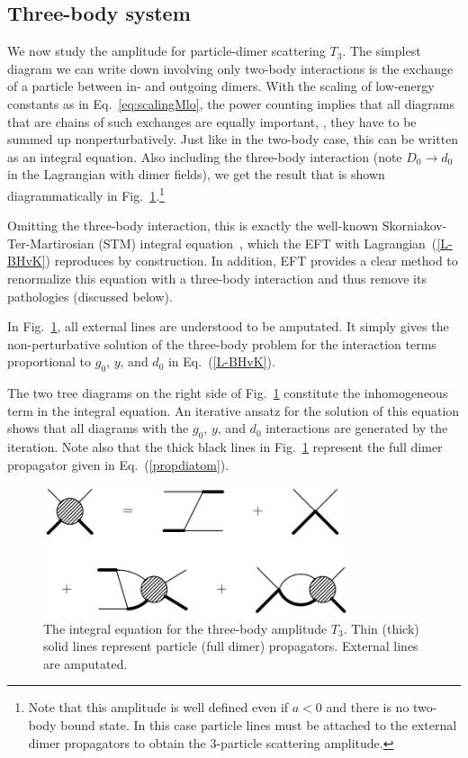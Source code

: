 \subsection{Three-body system}
\label{sec:EFT-ThreeBosons}

We now study the amplitude for particle-dimer scattering $T_3$.  The simplest 
diagram we can write down involving only two-body interactions is the exchange 
of a particle between in- and outgoing dimers.  With the scaling of low-energy 
constants as in Eq.~\eqref{eq:scalingMlo}, the power counting implies that all 
diagrams that are chains of such exchanges are equally important, \ie, they have 
to be summed up nonperturbatively.  Just like in the two-body case, this can be 
written as an integral equation.  Also including the three-body interaction 
(note $D_0 \to d_0$ in the Lagrangian with dimer fields), we get the result that 
is shown diagrammatically in Fig.~\ref{fig:inteq12}.\footnote{Note that this 
amplitude is well defined even if $a<0$ and there is no two-body bound state. 
In this case particle lines must be attached to the external dimer propagators 
to obtain the 3-particle scattering amplitude.}

Omitting the three-body interaction, 
this is exactly the well-known Skorniakov-Ter-Martirosian (STM)
integral equation~\cite{Skorniakov:1957aa}, which the EFT with
Lagrangian~(\ref{L-BHvK}) reproduces by construction.  In addition, EFT 
provides a clear method to renormalize this equation with a three-body 
interaction and thus remove its pathologies (discussed below).

In Fig.~\ref{fig:inteq12}, all external lines are understood to be amputated.
It simply gives the non-perturbative solution of the three-body problem
for the interaction terms proportional to $g_0$, $y$, and $d_0$ in 
Eq.~(\ref{L-BHvK}).

The two tree diagrams on the right side of Fig.~\ref{fig:inteq12} constitute the 
inhomogeneous term in the integral equation.  An iterative ansatz for the 
solution of this equation shows that all diagrams with the $g_0$, $y$, and 
$d_0$ interactions are generated by the iteration.  Note also that the thick 
black lines in Fig.~\ref{fig:inteq12} represent the full dimer propagator given 
in Eq.~(\ref{propdiatom}).

\begin{figure}[htb]
\bigskip
\centerline{\includegraphics*[width=9cm,angle=0]{fig_feyn8c.pdf}}
\medskip
\caption
{The integral equation for the three-body amplitude $T_3$. Thin (thick)
solid lines represent particle (full dimer) propagators. External lines
are amputated.}
\label{fig:inteq12}
\end{figure}

